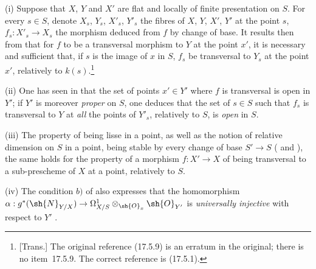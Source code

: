 \begin{remarks}[17.13.4]
\label{IV.17.13.4}
(i)
Suppose that $X$, $Y$ and $X'$ are flat and locally of finite presentation on $S$.
For every $s\in S$, denote $X_s$, $Y_s$, $X'_s$, $Y'_s$ the fibres of $X$, $Y$, $X'$, $Y'$ at the point $s$, $f_s:X'_s\to X_s$ the morphism deduced from $f$ by change of base.
It results then from  that for $f$ to be a transversal morphism to $Y$ at the point $x'$, it is necessary and sufficient that, if $s$ is the image of $x$ in $S$, $f_s$ be transversal to $Y_s$ at the point $x'$, relatively to $k(s)$.\footnote{[Trans.] The original reference (17.5.9) is an erratum in the original; there is no item~17.5.9. The correct reference is (17.5.1).}

(ii)
One has seen in  that the set of points $x'\in Y'$ where $f$ is transversal is open in $Y'$; if $Y'$ is moreover \emph{proper} on $S$, one deduces that the set of $s\in S$ such that $f_s$ is transversal to $Y$ at \emph{all} the points of $Y'_s$, relatively to $S$, is \emph{open} in $S$.

(iii)
The property of being lisse in a point, as well as the notion of relative dimension on $S$ in a point, being stable by every change of base $S'\to S$ ( and ), the same holds for the property of a morphism $f:X'\to X$ of being transversal to a sub-prescheme of $X$ at a point, relatively to $S$.

(iv)
The condition $b)$ of  also expresses that the homomorphism $\alpha:g^*(\sh{N}_{Y/X})\to\Omega^1_{X/S}\otimes_{\sh{O}_x}\sh{O}_{Y'}$ is \emph{universally injective} with respect to $Y'$ .
\end{remarks}

